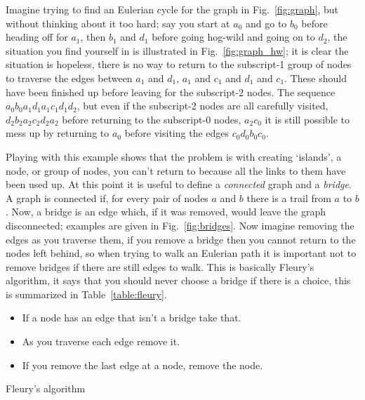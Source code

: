 \documentclass[11pt,a4paper]{scrartcl}
\begin{document}
Imagine trying to find an Eulerian cycle for the graph in
Fig.~\ref{fig:graph}, but without thinking about it too hard; say you
start at $a_0$ and go to $b_0$ before heading off for $a_1$, then
$b_1$ and $d_1$ before going hog-wild and going on to $d_2$, the
situation you find yourself in is illustrated in
Fig.~\ref{fig:graph_hw}; it is clear the situation is hopeless, there
is no way to return to the subscript-1 group of nodes to traverse the
edges between $a_1$ and $d_1$, $a_1$ and $c_1$ and $d_1$ and
$c_1$. These should have been finished up before leaving for the
subscript-2 nodes. The sequence $a_0b_0a_1d_1a_1c_1d_1d_2$, but even
if the subscript-2 nodes are all carefully visited,
$d_2b_2a_2c_2d_2a_2$ before returning to the subscript-0 nodes,
$a_2c_0$ it is still possible to mess up by returning to $a_0$ before
visiting the edges $c_0d_0b_0c_0$.

Playing with this example shows that the problem is with creating
\lq{}islands\rq{}, a node, or group of nodes, you can't return to
because all the links to them have been used up. At this point it is
useful to define a \textsl{connected} graph and a \textsl{bridge}. A
graph is connected if, for every pair of nodes $a$ and $b$ there is a
trail from $a$ to $b$. Now, a bridge is an edge which, if it was
removed, would leave the graph disconnected; examples are given in
Fig.~\ref{fig:bridges}. Now imagine removing the edges as you traverse
them, if you remove a bridge then you cannot return to the nodes left
behind, so when trying to walk an Eulerian path it is important not to
remove bridges if there are still edges to walk. This is basically
Fleury's algorithm, it says that you should never choose a bridge if
there is a choice, this is summarized in Table~\ref{table:fleury}.

\begin{table}
\begin{itemize}
\item If a node has an edge that isn't a bridge take that.
\item As you traverse each edge remove it.
\item If you remove the last edge at a node, remove the node.
\end{itemize}
\caption{Fleury's algorithm \label{table:fleury}}
\end{table}
  
\end{document}
